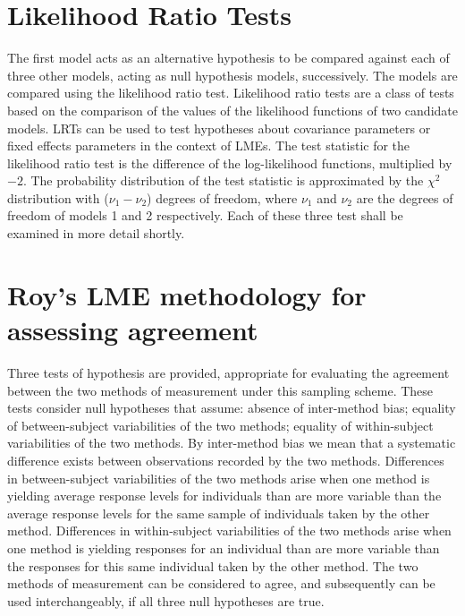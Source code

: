\documentclass[12pt, a4paper]{report}
\theoremstyle{plain}
\theoremstyle{definition}
\theoremstyle{remark}
\begin{document}
\section{Likelihood Ratio Tests}


The first model acts as an alternative hypothesis to be compared against each of three other models, acting as null hypothesis models, successively. The models are compared using the likelihood ratio test. Likelihood ratio tests are a class of tests based on the comparison of the values of the likelihood functions of two candidate models. LRTs can be used to test hypotheses about covariance parameters or fixed effects parameters in the context of LMEs. The test statistic for the likelihood ratio test is the difference of the log-likelihood functions, multiplied by $-2$.
The probability distribution of the test statistic is approximated by the $\chi^2$ distribution with ($\nu_{1} - \nu_{2}$) degrees of freedom, where $\nu_{1}$ and $\nu_{2}$ are the degrees of freedom of models 1 and 2 respectively. Each of these three test shall be examined in more detail shortly.

\bigskip

\section{Roy's LME methodology for assessing agreement}



Three tests of hypothesis are provided, appropriate for evaluating the agreement between the two methods of measurement under this sampling scheme. These tests consider null hypotheses that assume: absence of inter-method bias; equality of between-subject variabilities of the two methods; equality of within-subject variabilities of the two methods. By inter-method bias we mean that a systematic difference exists between observations recorded by the two methods. 
\bigskip
Differences in between-subject variabilities of the two methods arise when one method is yielding average response levels for individuals than are more variable than the average response levels for the same sample of individuals taken by the other method.  Differences in within-subject variabilities of the two methods arise when one method is yielding responses for an individual than are more variable than the responses for this same individual taken by the other method. The two methods of measurement can be considered to agree, and subsequently can be used interchangeably, if all three null hypotheses are true.	
\end{document}
